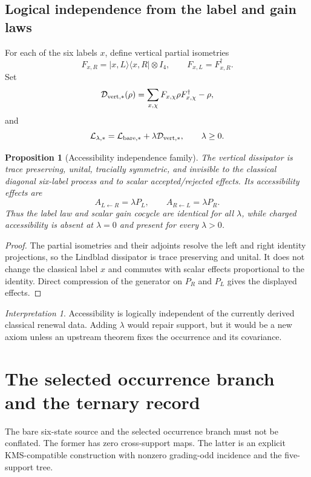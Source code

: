 \documentclass[11pt,oneside,openany]{book}
\numberwithin{equation}{chapter}
\newtheorem{proposition}[theorem]{Proposition}
\theoremstyle{definition}
\theoremstyle{remark}
\newtheorem{interpretation}[theorem]{Interpretation}
\begin{document}
\section{Logical independence from the label and gain laws}
For each of the six labels $x$, define vertical partial isometries
\[
 F_{x,R}=|x,L\rangle\langle x,R|\otimes I_4,
 \qquad
 F_{x,L}=F_{x,R}^\dagger.
\]
Set
\[
 \mathcal D_{\rm vert,*}(\rho)
 =\sum_{x,\chi}F_{x,\chi}\rho F_{x,\chi}^\dagger-\rho,
\]
and
\[
 \mathcal L_{\lambda,*}
 =\mathcal L_{\rm bare,*}+\lambda\mathcal D_{\rm vert,*},
 \qquad \lambda\ge0.
\]

\begin{proposition}[Accessibility independence family]
\label{prop:vertical-independence}
The vertical dissipator is trace preserving, unital, tracially symmetric, and invisible to the classical diagonal six-label process and to scalar accepted/rejected effects.  Its accessibility effects are
\[
 \boxed{
 A_{L\leftarrow R}=\lambda P_L,
 \qquad
 A_{R\leftarrow L}=\lambda P_R.
 }
\]
Thus the label law and scalar gain cocycle are identical for all $\lambda$, while charged accessibility is absent at $\lambda=0$ and present for every $\lambda>0$.
\end{proposition}

\begin{proof}
The partial isometries and their adjoints resolve the left and right identity projections, so the Lindblad dissipator is trace preserving and unital.  It does not change the classical label $x$ and commutes with scalar effects proportional to the identity.  Direct compression of the generator on $P_R$ and $P_L$ gives the displayed effects.
\end{proof}

\begin{interpretation}
Accessibility is logically independent of the currently derived classical renewal data.  Adding $\lambda$ would repair support, but it would be a new axiom unless an upstream theorem fixes the occurrence and its covariance.
\end{interpretation}

\chapter{The selected occurrence branch and the ternary record}
\label{ch:occurrence-povm}

The bare six-state source and the selected occurrence branch must not be
conflated.  The former has zero cross-support maps.  The latter is an
explicit KMS-compatible construction with nonzero grading-odd incidence and
the five-support tree.
\end{document}
